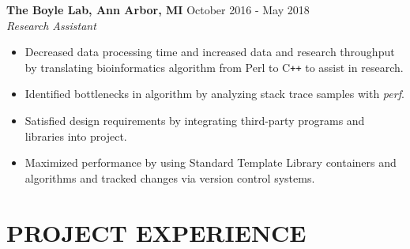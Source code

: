 \documentclass[overlapped]{res}
\begin{document}
\begin{resume}
\begin{itemize}
                \end{itemize}

                \textbf{The Boyle Lab, Ann Arbor, MI}
                \hfill October 2016 - May 2018 \\
                {\sl Research Assistant}
                 \begin{itemize}  \itemsep -2pt %
                 \item Decreased data processing time and increased data and research throughput
                  by translating bioinformatics algorithm 
                 from Perl to C\texttt{++}
                 to assist in research.
                 
                 \item Identified bottlenecks in algorithm by analyzing stack trace samples with \textit{perf}.
                 
                 \item Satisfied design requirements by integrating third-party programs 
                 and libraries into project.
                 
                 \item Maximized performance by using Standard Template Library containers and algorithms
                 and tracked changes via version control systems.
                \end{itemize}


 \section{PROJECT EXPERIENCE}
      

\end{resume}
\end{document}

